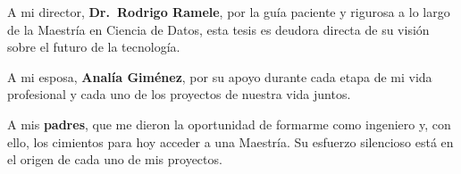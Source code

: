 \documentclass[../00_Main/Main.tex]{subfiles}
\begin{document}
A mi director, \textbf{Dr.\ Rodrigo Ramele}, por la gu\'ia paciente
y rigurosa a lo largo de la Maestr\'ia en Ciencia de Datos, esta tesis
es deudora directa de su visi\'on sobre el futuro de la tecnolog\'ia.

A mi esposa, \textbf{Anal\'ia Gim\'enez}, por su apoyo durante cada
etapa de mi vida profesional y cada uno de los proyectos de nuestra vida juntos.

A mis \textbf{padres}, que me dieron la oportunidad de formarme
como ingeniero y, con ello, los cimientos para hoy acceder a una
Maestr\'ia. Su esfuerzo silencioso est\'a en el origen de cada
uno de mis proyectos.

\biblio %
\end{document}
